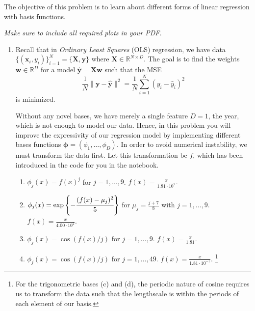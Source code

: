 \documentclass[submit]{harvardml}
\begin{document}

\newpage
\begin{problem}

 The objective of this problem is to learn about different forms of
 linear regression with basis functions.

\vspace{1em}
\noindent\emph{Make sure to include all required plots in your PDF.}

\begin{enumerate}
\item 
Recall that in \emph{Ordinary Least Squares} (OLS) regression,
we have data $\{(\mathbf{x}_i, y_i)\}_{i=1}^N = \{\mathbf{X}, \mathbf{y}\}$ 
where $\mathbf{X} \in \mathbb{R}^{N\times D}$. The goal is to find 
the weights $\mathbf{w} \in \mathbb{R}^{D}$ for a model 
$\hat{\mathbf{y}} = \mathbf{X}\mathbf{w}$ such that the MSE 
\[ \frac{1}{N} \| \mathbf{y} - \hat{\mathbf{y}}\|^2 = \frac{1}{N} \sum_{i = 1} ^N (y_i - \hat{y}_i)^2\] 
is minimized. 

Without any novel bases, we have merely a single feature $D=1$, 
the year, which is not enough to model our data. Hence, in this 
problem you will improve the expressivity of our regression 
model by implementing different bases functions 
$\mathbf{\phi} = (\phi_1,\ldots,\phi_D)$. In order to avoid numerical instability, 
we must transform the data first. Let
this transformation be $f$, which has been introduced in
the code for you in the notebook.
\begin{enumerate}
  \item $\phi_j(x)= f(x)^j$ for $j=1,\ldots, 9$. $f(x) = \frac{x}{1.81 \cdot 10^{2}}.$
  \item $\phi_j(x) = \exp\left\{-\cfrac{(f(x)-\mu_j)^2}{5}\right\}$ for $\mu_j=\frac{j + 7}{8}$ with $j=1,\ldots, 9$. $f(x) = \frac{x}{4.00 \cdot 10^{2}}.$
  \item $\phi_j(x) =  \cos(f(x) / j)$ for $j=1, \ldots, 9$. $f(x) = \frac{x}{1.81}$.
  \item $\phi_j(x) = \cos(f(x) / j)$ for $j=1, \ldots, 49$. $f(x) = \frac{x}{1.81 \cdot 10^{-1}}$. \footnote{For the trigonometric bases (c) and (d), the periodic nature of
cosine requires us to transform the data such that the 
lengthscale is within the periods of each element of our basis.}

\end{enumerate}


\end{enumerate}
\end{problem}
\end{document}
